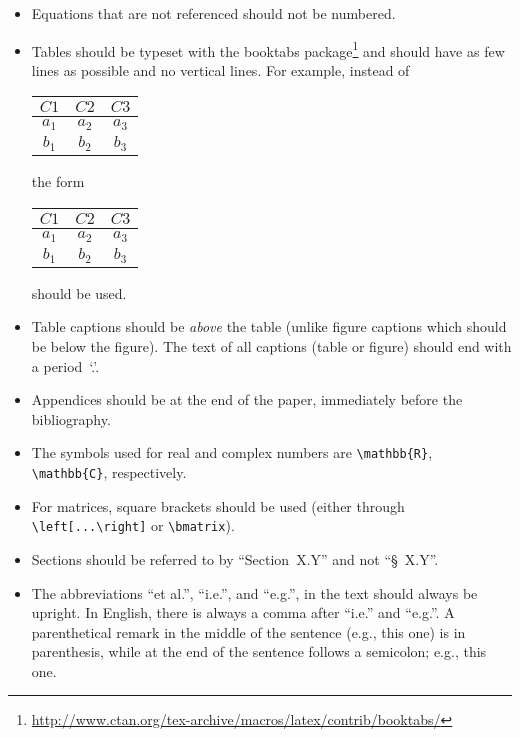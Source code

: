 \documentclass[parskip=half]{scrartcl}
\begin{document}
\begin{itemize}
\item Equations that are not referenced should not be numbered.

\item Tables should be typeset with the booktabs
  package\footnote{\url{http://www.ctan.org/tex-archive/macros/latex/contrib/booktabs/}}
  and should have as few lines as possible and no vertical lines.  For example,
  instead of
\begin{center}
  \begin{tabular}{|c|c|c|}\hline
  $C1$ & $C2$ & $C3$ \\ \hline
  $a_1$ & $a_2$ & $a_3$ \\ \hline
  $b_1$ & $b_2$ & $b_3$ \\ \hline
  \end{tabular}
\end{center}
the form
\begin{center}
  \begin{tabular}{ccc}\toprule
  $C1$ & $C2$ & $C3$ \\ \midrule
  $a_1$ & $a_2$ & $a_3$ \\
  $b_1$ & $b_2$ & $b_3$\\
  \bottomrule
  \end{tabular}
\end{center}
should be used.
\item Table captions should be \emph{above} the table (unlike figure captions
  which should be below the figure). The text of all captions (table or figure)
  should end with a period~`.'.

\item Appendices should be at the end of the paper, immediately before the
  bibliography.

\item The symbols used for real and complex numbers are \verb|\mathbb{R}|,
  \verb|\mathbb{C}|, respectively.

\item For matrices, square brackets should be used
(either through \verb|\left[...\right]| or \verb|\bmatrix|).

\item Sections should be referred to by ``Section~X.Y'' and not ``\S~X.Y''.

\item The abbreviations ``et al.'', ``i.e.'', and ``e.g.'', in the text should
  always be upright. In English, there is always a comma after ``i.e.'' and
  ``e.g.''. A parenthetical remark in the middle of the sentence (e.g., this
  one) is in parenthesis, while at the end of the sentence follows a semicolon;
  e.g., this one.
\end{itemize}
\end{document}
